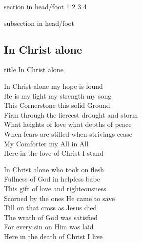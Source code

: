 \documentclass[aspectratio=169]{beamer}
\begin{document}
{
{ 
 {
 \begin{beamercolorbox}[ht=4.5ex,dp=1.5ex,%
      leftskip=.3cm,rightskip=.3cm plus1fil]{section in head/foot}
 \fontsize{12}{25}\selectfont 
\hyperlink{In Christ alone[]1}{1  }\hyperlink{In Christ alone[]2}{2  }\hyperlink{In Christ alone[]3}{3  }\hyperlink{In Christ alone[]4}{4  } 
 \end{beamercolorbox}%
  \begin{beamercolorbox}[ht=2.5ex,dp=1.125ex,%
   leftskip=.3cm,rightskip=.3cm plus1fil]{subsection in head/foot}
   \insertauthor
 \end{beamercolorbox}%
 }
}
\subsection{In Christ alone}
\hypertarget{In Christ alone[]}{}
\begin{frame}{}
 \vfill
  \centering
  \begin{beamercolorbox}[sep=8pt,center,shadow=true,rounded=true]{title}
    In Christ alone     
  \end{beamercolorbox}
  \vfill
\end{frame}

\hypertarget{In Christ alone[]1}{}
\begin{frame}{}
\fontsize{18.75}{22.5}\selectfont

In Christ alone my hope is found\\ 
He is my light my strength my song\\ 
This Cornerstone this solid Ground\\ 
Firm through the fiercest drought and storm\\ 
What heights of love what depths of peace\\ 
When fears are stilled when strivings cease\\ 
My Comforter my All in All\\ 
Here in the love of Christ I stand

\end{frame}
\hypertarget{In Christ alone[]2}{}
\begin{frame}{}
\fontsize{18.75}{22.5}\selectfont

In Christ alone who took on flesh\\ 
Fullness of God in helpless babe\\ 
This gift of love and righteousness\\ 
Scorned by the ones He came to save\\ 
Till on that cross as Jesus died\\ 
The wrath of God was satisfied\\ 
For every sin on Him was laid\\ 
Here in the death of Christ I live


\end{frame}}
\end{document}
